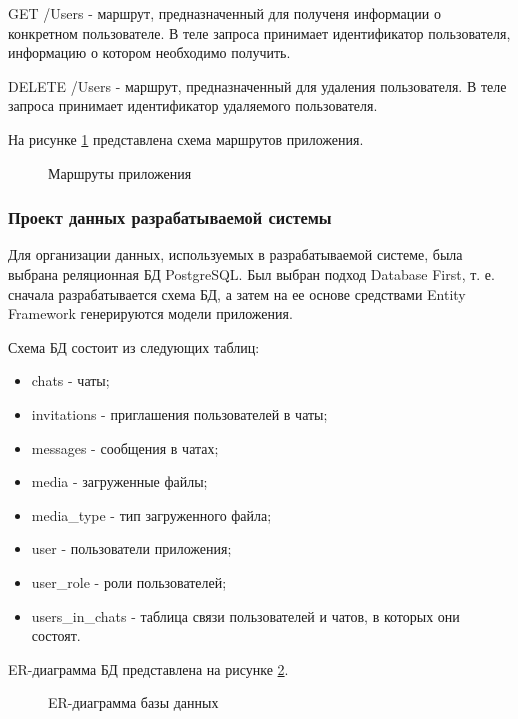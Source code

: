GET /Users - маршрут, предназначенный для полученя информации о конкретном пользователе. В теле запроса принимает идентификатор пользователя, информацию о котором необходимо получить.

DELETE /Users - маршрут, предназначенный для удаления пользователя. В теле запроса принимает идентификатор удаляемого пользователя.

На рисунке \ref{routes:image} представлена схема маршрутов приложения.

\begin{landscape}
	\begin{figure}[ht]
		\caption{Маршруты приложения}
		\label{routes:image}
	\end{figure}
\end{landscape}

\subsubsection{Проект данных разрабатываемой системы}

Для организации данных, используемых в разрабатываемой системе, была выбрана реляционная БД PostgreSQL. Был выбран подход Database First\cite{ef}, т. е. сначала разрабатывается схема БД, а затем на ее основе средствами Entity Framework генерируются модели приложения.

Схема БД состоит из следующих таблиц:
\begin{itemize}
	\item chats - чаты;
	\item invitations - приглашения пользователей в чаты;
	\item messages - сообщения в чатах;
	\item media - загруженные файлы;
	\item media\_type - тип загруженного файла;
	\item user - пользователи приложения;
	\item user\_role - роли пользователей;
	\item users\_in\_chats - таблица связи пользователей и чатов, в которых они состоят. 
\end{itemize}

ER-диаграмма БД представлена на рисунке \ref{erd:image}.

\begin{figure}[ht]
	\caption{ER-диаграмма базы данных}
	\label{erd:image}
\end{figure}

